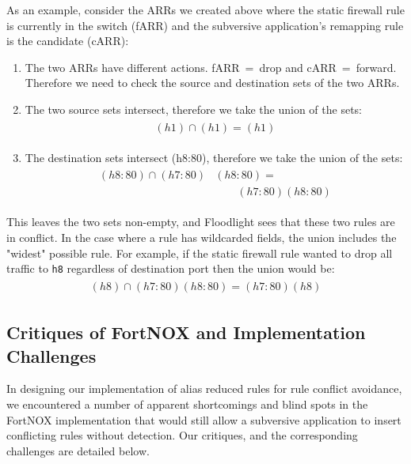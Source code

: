 As an example, consider the ARRs we created above where the static firewall rule is currently in the switch (fARR) and the subversive application's remapping rule is the candidate (cARR):

\begin{enumerate}
\item The two ARRs have different actions. \mbox{fARR = drop} and \mbox{cARR = forward}. Therefore we need to check the source and destination sets of the two ARRs.
\item The two source sets intersect, therefore we take the union of the sets:
\begin{align}
\begin{aligned}
(h1) \cap (h1) = (h1) \nonumber
\end{aligned}
\end{align}
\item The destination sets intersect (h8:80), therefore we take the union of the sets:
\begin{align}
\begin{aligned}
(h8:80) \cap (h7:80)&(h8:80) = \\
        & \qquad (h7:80) (h8:80) \nonumber
\end{aligned}
\end{align}
\end{enumerate} 

This leaves the two sets non-empty, and Floodlight sees that these two rules are in conflict.
In the case where a rule has wildcarded fields, the union includes the "widest" possible rule.
For example, if the static firewall rule wanted to drop all traffic to \texttt{h8} regardless of destination port then the union would be:
\begin{align}
\begin{aligned}
(h8) \cap (h7:80) (h8:80) =  (h7:80) (h8) \nonumber
\end{aligned}
\end{align}


\subsection{Critiques of FortNOX and Implementation Challenges}
\label{subsec:critique}
In designing our implementation of alias reduced rules for rule conflict avoidance, we encountered a number of apparent shortcomings and blind spots in the FortNOX implementation that would still allow a subversive application to insert conflicting rules without detection. Our critiques, and the corresponding challenges are detailed below.

